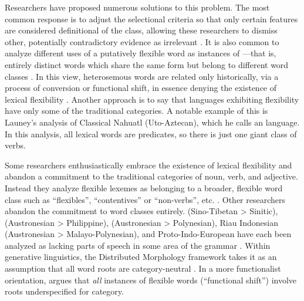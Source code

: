 Researchers have proposed numerous solutions to this problem. The most common response is to adjust the selectional criteria so that only certain features are considered definitional of the class, allowing these researchers to dismiss other, potentially contradictory evidence as irrelevant . It is also common to analyze different uses of a putatively flexible word as instances of —that is, entirely distinct words which share the same form but belong to different word classes \parencite{Lichtenberk1991}. In this view, heterosemous words are related only historically, via a process of conversion or functional shift, in essence denying the existence of lexical flexibility \parencite{EvansOsada2005}. Another approach is to say that languages exhibiting flexibility have only some of the traditional categories. A notable example of this is Launey's \parencites{Launey1994}{Launey2004} analysis of Classical Nahuatl (Uto-Aztecan), which he calls an  language. In this analysis, all lexical words are predicates, so there is just one giant class of verbs.

Some researchers enthusiastically embrace the existence of lexical flexibility and abandon a commitment to the traditional categories of noun, verb, and adjective. Instead they analyze flexible lexemes as belonging to a broader, flexible word class such as \enquote{flexibles}, \enquote{contentives} or \enquote{non-verbs}, etc. \parencites{HengeveldRijkhoff2005}{Luuk2010}. Other researchers abandon the commitment to word classes entirely.  (Sino-Tibetan > Sinitic),  (Austronesian > Philippine),  (Austronesian > Polynesian), Riau Indonesian (Austronesian > Malayo-Polynesian), and Proto-Indo-European have each been analyzed as lacking parts of speech in some area of the grammar . Within generative linguistics, the Distributed Morphology framework takes it as an assumption that all word roots are category-neutral \parencite{Siddiqi2018}. In a more functionalist orientation, \textcite{Farrell2001} argues that \emph{all} instances of flexible words (\enquote{functional shift}) involve roots underspecified for category.


